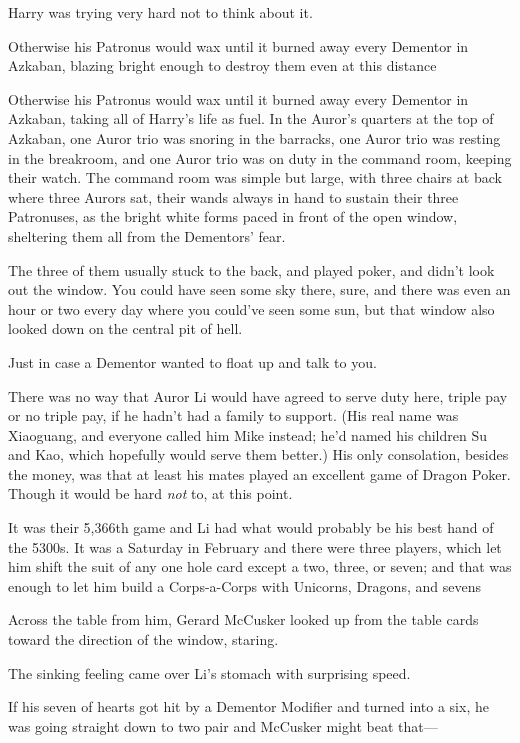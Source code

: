 Harry was trying very hard not to think about it.

Otherwise his Patronus would wax until it burned away every Dementor in
Azkaban, blazing bright enough to destroy them even at this distance{\el}

Otherwise his Patronus would wax until it burned away every Dementor in
Azkaban, taking all of Harry's life as fuel.
\sbreak
In the Auror's quarters at the top of Azkaban, one Auror trio was snoring in
the barracks, one Auror trio was resting in the breakroom, and one Auror trio
was on duty in the command room, keeping their watch. The command room was
simple but large, with three chairs at back where three Aurors sat, their wands
always in hand to sustain their three Patronuses, as the bright white forms
paced in front of the open window, sheltering them all from the Dementors' fear.

The three of them usually stuck to the back, and played poker, and didn't look
out the window. You could have seen some sky there, sure, and there was even an
hour or two every day where you could've seen some sun, but that window also
looked down on the central pit of hell.

Just in case a Dementor wanted to float up and talk to you.

There was no way that Auror Li would have agreed to serve duty here, triple pay
or no triple pay, if he hadn't had a family to support. (His real name was
Xiaoguang, and everyone called him Mike instead; he'd named his children Su and
Kao, which hopefully would serve them better.) His only consolation, besides
the money, was that at least his mates played an excellent game of Dragon
Poker. Though it would be hard \emph{not} to, at this point.

It was their 5,366th game and Li had what would probably be his best hand of
the 5300s. It was a Saturday in February and there were three players, which
let him shift the suit of any one hole card except a two, three, or seven; and
that was enough to let him build a Corps-a-Corps with Unicorns, Dragons, and
sevens{\el}

Across the table from him, Gerard McCusker looked up from the table cards
toward the direction of the window, staring.

The sinking feeling came over Li's stomach with surprising speed.

If his seven of hearts got hit by a Dementor Modifier and turned into a six, he
was going straight down to two pair and McCusker might beat that—

